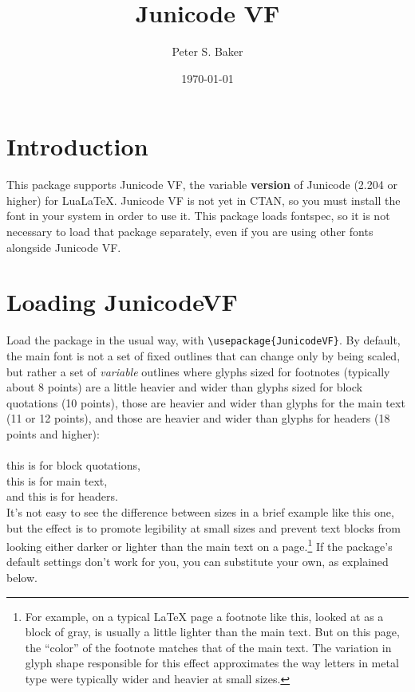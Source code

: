 \documentclass[12pt]{article}
\title{Junicode VF}
\author{Peter S. Baker}
\date{\today}
\newcommand{\lltech}{LuaLaTeX}
\begin{document}
\maketitle

\section{Introduction}

This package supports Junicode VF, the variable \textbf{version} of Junicode
(2.204 or higher) for \lltech. Junicode VF is not yet in CTAN, so you must
install the font in your system in order to use it. This package loads
fontspec, so it is not necessary to load that package separately, even if you are using
other fonts alongside Junicode VF.

\section{Loading JunicodeVF}

Load the package in the usual way, with {\small\verb|\usepackage{JunicodeVF}|}.
By default, the main font is not a set of fixed outlines that can change only
by being scaled, but rather a set of
\emph{variable} outlines where glyphs sized for footnotes (typically about 8 points) are a
little heavier and wider than glyphs sized for block quotations (10 points),
those are heavier and wider than glyphs for the main
text (11 or 12 points), and those are heavier and wider
than glyphs for headers (18 points and higher):\\[0.5ex]

\\
{\small this is for block quotations,}\\
this is for main text,\\[0.2ex]
{\Large and this is for headers.}\\[0.5ex]

\noindent It's not easy to see the difference between sizes in a brief example
like this one, but the effect is to promote legibility at small
sizes and prevent text blocks from looking
either darker or lighter than the main text on a page.\footnote{%
For example, on a typical LaTeX page a footnote like this, looked at as a block
of gray, is usually a little lighter than the main text. But on this page, the
“color” of the footnote matches that of the main text. The variation in glyph
shape responsible for this effect approximates the way letters in metal type were
typically wider and heavier at small sizes.} If the package's default settings
don't work for you, you can substitute your own, as explained below.
\end{document}

